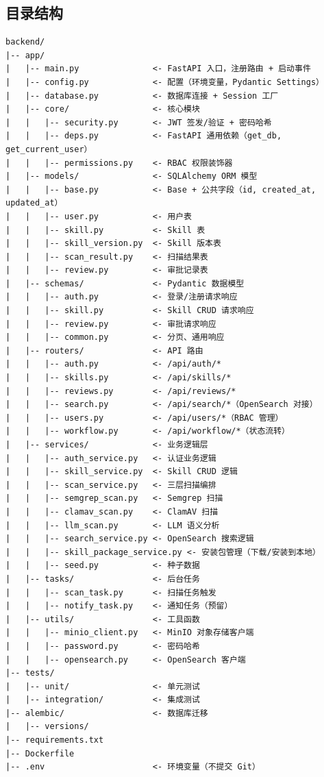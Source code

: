\documentclass[11pt,a4paper]{article}
\begin{document}
\subsection{目录结构}

\begin{verbatim}
backend/
|-- app/
|   |-- main.py               <- FastAPI 入口，注册路由 + 启动事件
|   |-- config.py             <- 配置（环境变量，Pydantic Settings）
|   |-- database.py           <- 数据库连接 + Session 工厂
|   |-- core/                 <- 核心模块
|   |   |-- security.py       <- JWT 签发/验证 + 密码哈希
|   |   |-- deps.py           <- FastAPI 通用依赖（get_db, get_current_user）
|   |   |-- permissions.py    <- RBAC 权限装饰器
|   |-- models/               <- SQLAlchemy ORM 模型
|   |   |-- base.py           <- Base + 公共字段（id, created_at, updated_at）
|   |   |-- user.py           <- 用户表
|   |   |-- skill.py          <- Skill 表
|   |   |-- skill_version.py  <- Skill 版本表
|   |   |-- scan_result.py    <- 扫描结果表
|   |   |-- review.py         <- 审批记录表
|   |-- schemas/              <- Pydantic 数据模型
|   |   |-- auth.py           <- 登录/注册请求响应
|   |   |-- skill.py          <- Skill CRUD 请求响应
|   |   |-- review.py         <- 审批请求响应
|   |   |-- common.py         <- 分页、通用响应
|   |-- routers/              <- API 路由
|   |   |-- auth.py           <- /api/auth/*
|   |   |-- skills.py         <- /api/skills/*
|   |   |-- reviews.py        <- /api/reviews/*
|   |   |-- search.py         <- /api/search/*（OpenSearch 对接）
|   |   |-- users.py          <- /api/users/*（RBAC 管理）
|   |   |-- workflow.py       <- /api/workflow/*（状态流转）
|   |-- services/             <- 业务逻辑层
|   |   |-- auth_service.py   <- 认证业务逻辑
|   |   |-- skill_service.py  <- Skill CRUD 逻辑
|   |   |-- scan_service.py   <- 三层扫描编排
|   |   |-- semgrep_scan.py   <- Semgrep 扫描
|   |   |-- clamav_scan.py    <- ClamAV 扫描
|   |   |-- llm_scan.py       <- LLM 语义分析
|   |   |-- search_service.py <- OpenSearch 搜索逻辑
|   |   |-- skill_package_service.py <- 安装包管理（下载/安装到本地）
|   |   |-- seed.py           <- 种子数据
|   |-- tasks/                <- 后台任务
|   |   |-- scan_task.py      <- 扫描任务触发
|   |   |-- notify_task.py    <- 通知任务（预留）
|   |-- utils/                <- 工具函数
|   |   |-- minio_client.py   <- MinIO 对象存储客户端
|   |   |-- password.py       <- 密码哈希
|   |   |-- opensearch.py     <- OpenSearch 客户端
|-- tests/
|   |-- unit/                 <- 单元测试
|   |-- integration/          <- 集成测试
|-- alembic/                  <- 数据库迁移
|   |-- versions/
|-- requirements.txt
|-- Dockerfile
|-- .env                      <- 环境变量（不提交 Git）
\end{verbatim}
\end{document}
